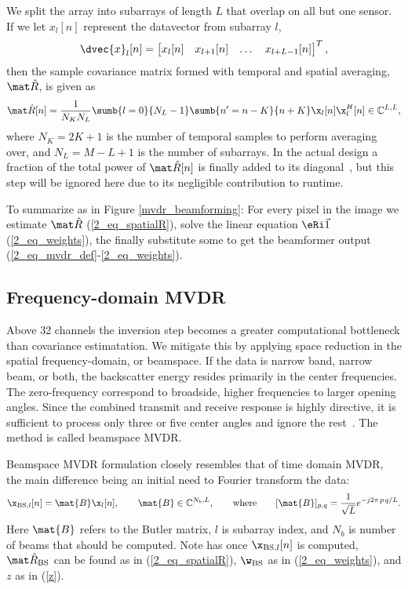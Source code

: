 {We split the array into subarrays of length $L$ that overlap on all but one sensor. If we let $x_l[n]$ represent the datavector from subarray $l$,
%
\begin{gather}
\dvec{x}_l[n] = \bmat{x_l[n] & x_{l+1}[n] & \dots & x_{l+L-1}[n]}^T,
\end{gather}
%
then the sample covariance matrix formed with temporal and spatial averaging, $\eR$, is given as
%
\begin{gather}
\eR[n] =  \frac{1}{N_K N_L} \sumb{l=0}{N_L-1}\sumb{n'=n-K}{n+K} \x_l[n]\x_l^H[n] \in\mathbb{C}^{L,L},\label{2_eq_spatialR}
\end{gather}
%
where $N_K = 2K+1$ is the number of temporal samples to perform averaging over, and $N_L = M-L+1$ is the number of subarrays. In the actual design a fraction of the total power of $\eR[n]$ is finally added to its diagonal~\cite{Synnevag2007}, but this step will be ignored here due to its negligible contribution to runtime.

To summarize as in Figure \ref{mvdr_beamforming}: For every pixel in the image we estimate $\eR$ (\ref{2_eq_spatialR}), solve the linear equation $\eRi\1$ (\ref{2_eq_weights}), the finally substitute some to get the beamformer output (\ref{2_eq_mvdr_def}-\ref{2_eq_weights}).



\subsection{Frequency-domain MVDR}

Above 32 channels the inversion step becomes a greater computational bottleneck than covariance estimatation. We mitigate this by applying space reduction in the spatial frequency-domain, or beamspace. If the data is narrow band, narrow beam, or both, the backscatter energy resides primarily in the center frequencies. The zero-frequency correspond to broadside, higher frequencies to larger opening angles. Since the combined transmit and receive response is highly directive, it is sufficient to process only three or five center angles and ignore the rest~\cite{Nilsen2009a,VanTrees2002}. The method is called beamspace MVDR.

Beamspace MVDR formulation closely resembles that of time domain MVDR, the main difference being an initial need to Fourier transform the data:
%
\begin{gather}
\x_{\text{BS},l}[n] = \mat{B}\x_l[n], \qquad \mat{B}\in \mathbb{C}^{N_b,L}, \qquad \text{where} \qquad [\mat{B}]_{p,q} = \frac{1}{\sqrt{L}} e^{-j2\pi\,p\,q/L}.\label{2_eq_beamspace}
\end{gather}
%
Here $\mat{B}$ refers to the Butler matrix, $l$ is subarray index, and $N_b$ is number of beams that should be computed. Note has once $\x_{\text{BS},l}[n]$ is computed, $\eR_\text{BS}$ can be found as in (\ref{2_eq_spatialR}), $\w_\text{BS}$ as in (\ref{2_eq_weights}), and $z$ as in (\ref{z}).

}
